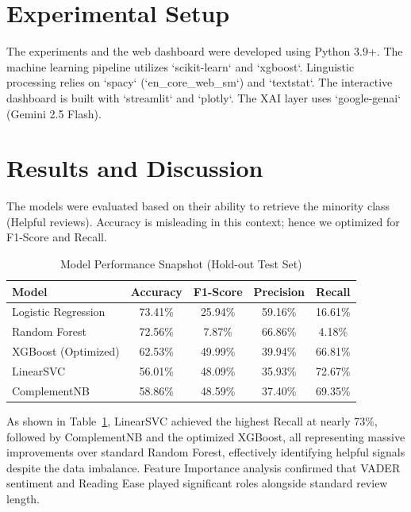\documentclass[11pt,a4paper,twoside]{article}
\begin{document}
\section{Experimental Setup}
The experiments and the web dashboard were developed using Python 3.9+. The machine learning pipeline utilizes `scikit-learn` and `xgboost`. Linguistic processing relies on `spacy` (`en_core_web_sm`) and `textstat`. The interactive dashboard is built with `streamlit` and `plotly`. The XAI layer uses `google-genai` (Gemini 2.5 Flash).

\section{Results and Discussion}
The models were evaluated based on their ability to retrieve the minority class (Helpful reviews). Accuracy is misleading in this context; hence we optimized for F1-Score and Recall.

\begin{table}[ht]
\centering
\caption{Model Performance Snapshot (Hold-out Test Set)}
\label{tab:performance}
\begin{tabular}{l c c c c}
\toprule
\textbf{Model} & \textbf{Accuracy} & \textbf{F1-Score} & \textbf{Precision} & \textbf{Recall} \\
\midrule
Logistic Regression & 73.41\% & 25.94\% & 59.16\% & 16.61\% \\
Random Forest & 72.56\% & 7.87\% & 66.86\% & 4.18\% \\
XGBoost (Optimized) & 62.53\% & 49.99\% & 39.94\% & 66.81\% \\
LinearSVC & 56.01\% & 48.09\% & 35.93\% & 72.67\% \\
ComplementNB & 58.86\% & 48.59\% & 37.40\% & 69.35\% \\
\bottomrule
\end{tabular}
\end{table}

As shown in Table~\ref{tab:performance}, LinearSVC achieved the highest Recall at nearly 73\%, followed by ComplementNB and the optimized XGBoost, all representing massive improvements over standard Random Forest, effectively identifying helpful signals despite the data imbalance. Feature Importance analysis confirmed that VADER sentiment and Reading Ease played significant roles alongside standard review length.
\end{document}
